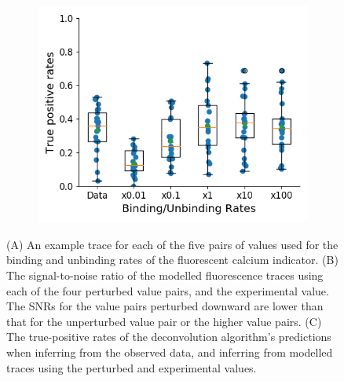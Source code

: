 \begin{figure}[p]
\begin{subfigure}{0.45\textwidth}
        \includegraphics[width=\linewidth]{figures/calcium_chapter/b_i_f_i_perturbed_oasis_tp_paper.png}
        \caption{}
        \label{fig:rates_perturbed_inference}
    \end{subfigure}
    \caption{(A) An example trace for each of the five pairs of values used for the binding and unbinding rates of the fluorescent calcium indicator. (B) The signal-to-noise ratio of the modelled fluorescence traces using each of the four perturbed value pairs, and the experimental value. The SNRs for the value pairs perturbed downward are lower than that for the unperturbed value pair or the higher value pairs. (C) The true-positive rates of the deconvolution algorithm's predictions when inferring from the observed data, and inferring from modelled traces using the perturbed and experimental values.}
    \label{fig:rates_perturbed}
\end{figure}

